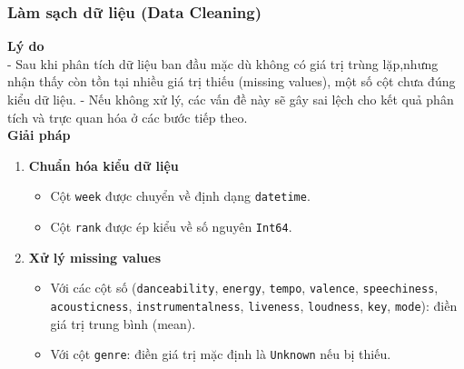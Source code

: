 \subsubsection{Làm sạch dữ liệu (Data Cleaning)}

\textbf{Lý do} \\

- Sau khi phân tích dữ liệu ban đầu mặc dù không có giá trị trùng lặp,nhưng nhận thấy còn tồn tại nhiều giá trị thiếu (missing values), một số cột chưa đúng kiểu dữ liệu.
- Nếu không xử lý, các vấn đề này sẽ gây sai lệch cho kết quả phân tích và trực quan hóa ở các bước tiếp theo. \\

\textbf{Giải pháp} \\

\begin{enumerate}[label=\arabic*]
    \item \textbf{Chuẩn hóa kiểu dữ liệu}
    \begin{itemize}
        \item Cột \texttt{week} được chuyển về định dạng \texttt{datetime}.
        \item Cột \texttt{rank} được ép kiểu về số nguyên \texttt{Int64}.
    \end{itemize}

    \item \textbf{Xử lý missing values}
    \begin{itemize}
        \item Với các cột số (\texttt{danceability}, \texttt{energy}, \texttt{tempo}, 
        \texttt{valence}, \texttt{speechiness}, \texttt{acousticness}, 
        \texttt{instrumentalness}, \texttt{liveness}, \texttt{loudness}, 
        \texttt{key}, \texttt{mode}): điền giá trị trung bình (mean).
        \item Với cột \texttt{genre}: điền giá trị mặc định là \texttt{Unknown} nếu bị thiếu.
    \end{itemize}


\end{enumerate}
